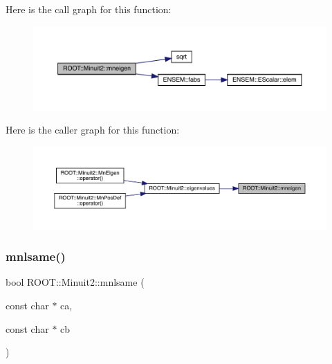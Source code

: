Here is the call graph for this function\+:\nopagebreak
\begin{figure}[H]
\begin{center}
\leavevmode
\includegraphics[width=350pt]{d6/d3a/namespaceROOT_1_1Minuit2_a4a6b91c57b107c48f582569401bb12e9_cgraph}
\end{center}
\end{figure}
Here is the caller graph for this function\+:\nopagebreak
\begin{figure}[H]
\begin{center}
\leavevmode
\includegraphics[width=350pt]{d6/d3a/namespaceROOT_1_1Minuit2_a4a6b91c57b107c48f582569401bb12e9_icgraph}
\end{center}
\end{figure}
\mbox{\label{namespaceROOT_1_1Minuit2_a3f90b826c2c1b4313f9a90c22b8ee657}} 
\subsubsection{\texorpdfstring{mnlsame()}{mnlsame()}}
{\footnotesize\ttfamily bool R\+O\+O\+T\+::\+Minuit2\+::mnlsame (\begin{DoxyParamCaption}\item[{const char $\ast$}]{ca,  }\item[{const char $\ast$}]{cb }\end{DoxyParamCaption})}

